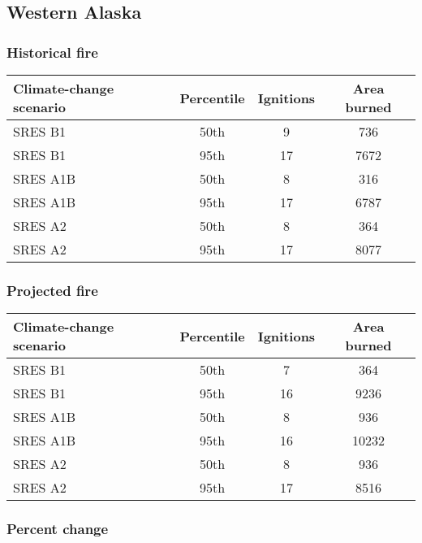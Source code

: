 \documentclass{article}\usepackage[]{graphicx}\usepackage[]{color}
\newcommand{\headcol}{\rowcolor{tableheadcolor}}
\begin{document}
\newpage
\subsection{Western Alaska}
\subsubsection{Historical fire}

\begin{table}[ht]
\centering
\begin{tabular}{lccc}
  \headcol 
 \toprule
Climate-change scenario & Percentile & Ignitions & Area burned \\ 
  \midrule
SRES B1 & 50th & 9 & 736 \\ 
  SRES B1 & 95th & 17 & 7672 \\ 
  SRES A1B & 50th & 8 & 316 \\ 
  SRES A1B & 95th & 17 & 6787 \\ 
  SRES A2 & 50th & 8 & 364 \\ 
  SRES A2 & 95th & 17 & 8077 \\ 
   \bottomrule
\end{tabular}
\end{table}


\subsubsection{Projected fire}

\begin{table}[ht]
\centering
\begin{tabular}{lccc}
  \headcol 
 \toprule
Climate-change scenario & Percentile & Ignitions & Area burned \\ 
  \midrule
SRES B1 & 50th & 7 & 364 \\ 
  SRES B1 & 95th & 16 & 9236 \\ 
  SRES A1B & 50th & 8 & 936 \\ 
  SRES A1B & 95th & 16 & 10232 \\ 
  SRES A2 & 50th & 8 & 936 \\ 
  SRES A2 & 95th & 17 & 8516 \\ 
   \bottomrule
\end{tabular}
\end{table}


\subsubsection{Percent change}
\end{document}
